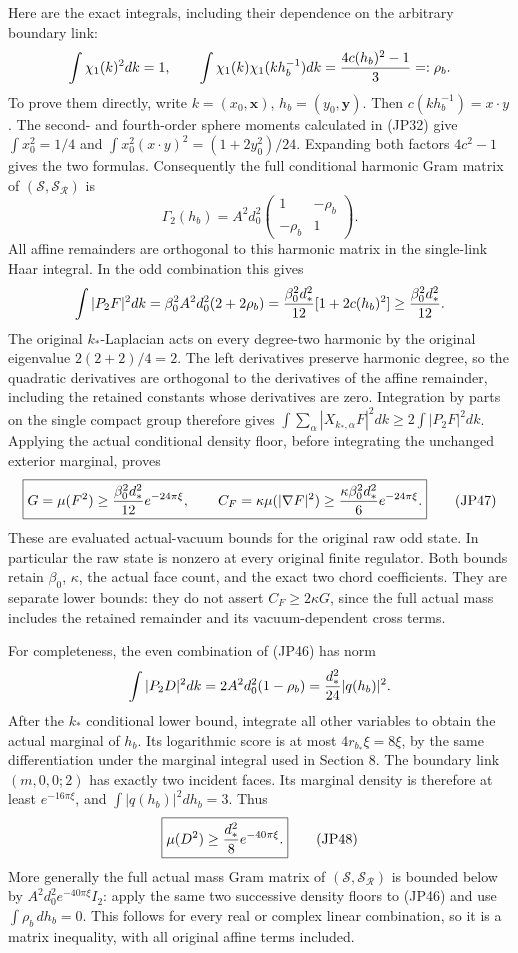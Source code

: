 \documentclass[11pt]{article}
\begin{document}
Here are the exact integrals, including their dependence on the
arbitrary boundary link:
\[
 \int\chi_1(k)^2dk=1,\qquad
 \int\chi_1(k)\chi_1(kh_b^{-1})dk
       ={4c(h_b)^2-1\over3}=:\rho_b.
\]
To prove them directly, write \(k=(x_0,\mathbf x)\),
\(h_b=(y_0,\mathbf y)\). Then \(c(kh_b^{-1})=x\cdot y\).
The second- and fourth-order sphere moments calculated in (JP32)
give \(\int x_0^2=1/4\) and
\(\int x_0^2(x\cdot y)^2=(1+2y_0^2)/24\).
Expanding both factors \(4c^2-1\) gives the two formulas.
Consequently the full conditional harmonic Gram matrix of
\((\mathcal S,\mathcal S_{\mathcal R})\) is
\[
 \Gamma_2(h_b)=A^2d_0^2
       \begin{pmatrix}1&-\rho_b\\-\rho_b&1\end{pmatrix}.
 \tag{JP46}
\]
All affine remainders are orthogonal to this harmonic matrix in
the single-link Haar integral. In the odd combination this gives
\[
 \int|P_2F|^2dk
 =\beta_0^2A^2d_0^2(2+2\rho_b)
 ={\beta_0^2d_*^2\over12}[1+2c(h_b)^2]
 \ge{\beta_0^2d_*^2\over12}.
\]
The original \(k_*\)-Laplacian acts on every degree-two harmonic
by the original eigenvalue \(2(2+2)/4=2\). The left derivatives
preserve harmonic degree, so the quadratic derivatives are
orthogonal to the derivatives of the affine remainder, including
the retained constants whose derivatives are zero. Integration by
parts on the single compact group therefore gives
\(\int\sum_\alpha|X_{k_*,\alpha}F|^2dk
\ge2\int|P_2F|^2dk\).
Applying the actual conditional density floor, before integrating
the unchanged exterior marginal, proves
\[
 \boxed{\displaystyle
 G=\mu(F^2)\ge{\beta_0^2d_*^2\over12}e^{-24\pi\xi},\qquad
 C_F=\kappa\mu(|\nabla F|^2)
       \ge{\kappa\beta_0^2d_*^2\over6}e^{-24\pi\xi}.}
 \tag{JP47}
\]
These are evaluated actual-vacuum bounds for the original raw odd
state. In particular the raw state is nonzero at every original
finite regulator. Both bounds retain \(\beta_0\), \(\kappa\), the
actual face count, and the exact two chord coefficients.
They are separate lower bounds: they do not assert
\(C_F\ge2\kappa G\), since the full actual mass includes the
retained remainder and its vacuum-dependent cross terms.

For completeness, the even combination of (JP46) has norm
\[
 \int|P_2D|^2dk
   =2A^2d_0^2(1-\rho_b)
   ={d_*^2\over24}|q(h_b)|^2.
\]
After the \(k_*\) conditional lower bound, integrate all other
variables to obtain the actual marginal of \(h_b\). Its logarithmic
score is at most \(4r_{b_*}\xi=8\xi\), by the same differentiation
under the marginal integral used in Section 8. The boundary link
\((m,0,0;2)\) has exactly two incident faces. Its marginal density
is therefore at least \(e^{-16\pi\xi}\), and
\(\int|q(h_b)|^2dh_b=3\). Thus
\[
 \boxed{\displaystyle
 \mu(D^2)\ge{d_*^2\over8}e^{-40\pi\xi}.}
 \tag{JP48}
\]
More generally the full actual mass Gram matrix of
\((\mathcal S,\mathcal S_{\mathcal R})\) is bounded below by
\(A^2d_0^2e^{-40\pi\xi}I_2\): apply the same two successive
density floors to (JP46) and use \(\int\rho_b\,dh_b=0\).
This follows for every real or complex linear combination, so it
is a matrix inequality, with all original affine terms included.
\end{document}
